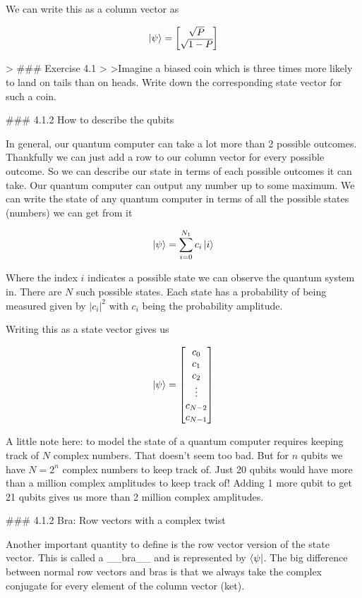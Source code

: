 \documentclass{book}
\begin{document}
We can write this as a column vector as

$$
\ket{\psi} = \begin{bmatrix}
\sqrt{P} \\ \sqrt{1-P}
\end{bmatrix}
$$



> ### Exercise 4.1 
>
>Imagine a biased coin which is three times more likely to land on tails than on heads. Write down the corresponding state vector for such a coin.


### 4.1.2 How to describe the qubits 

In general, our quantum computer can take a lot more than 2 possible outcomes. Thankfully we can just add a row to our column vector for every possible outcome. So we can describe our state in terms of each possible outcomes it can take. Our quantum computer can output any number up to some maximum.  We can write the state of any quantum computer in terms of all the possible states (numbers) we can get from it

$$
\ket{\psi} = \sum_{i = 0}^{N_1} c_i \ket{i}
$$


Where the index $i$ indicates a possible state we can observe the quantum system in. There are $N$ such possible states. Each state has a probability of being measured given by $|c_i|^2$  with $c_i$ being the probability amplitude. 

Writing this as a state vector gives us 

$$
\ket{\psi} = \begin{bmatrix} c_0 \\ c_1 \\ c_2 \\ \vdots \\ c_{N-2} \\ c_{N-1} \end{bmatrix}
$$

A little note here: to model the state of a quantum computer requires keeping track of $N$ complex numbers. That doesn't seem too bad.  But for $n$ qubits we have $N = 2^n$ complex numbers to keep track of. Just 20 qubits would have more than a million complex amplitudes to keep track of! Adding 1 more qubit to get 21 qubits gives us more than 2 million complex amplitudes. 


### 4.1.2 Bra: Row vectors with a complex twist


Another important quantity to define is the row vector version of the state vector. This is called a __bra__ and is represented by $\bra{\psi}$. The big difference between normal row vectors and bras is that we always take the complex conjugate for every element of the column vector (ket). 
\end{document}
